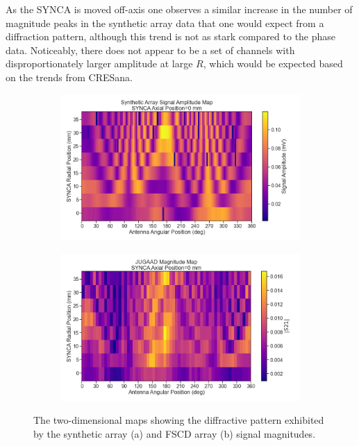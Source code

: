 As the SYNCA is moved off-axis one observes a similar increase in the number of magnitude peaks in the synthetic array data that one would expect from a diffraction pattern, although this trend is not as stark compared to the phase data. Noticeably, there does not appear to be a set of channels with disproportionately larger amplitude at large $R$, which would be expected based on the trends from CRESana. 

\begin{figure}[htbp]
\centering
\begin{subfigure}{.7\textwidth}
  \centering
  \includegraphics[width=1\textwidth]{figs/Chapter-5/230120_synth_array_signal_amplitude_map_z0.png}
  \caption{}
  \label{fig:synth-jugaad-mag-map}
\end{subfigure}
\par\medskip %
\begin{subfigure}{.7\textwidth}
  \centering
  \includegraphics[width=1\textwidth]{figs/Chapter-5/230123_jugaad_magnitude_map_z0.png}
  \caption{}
  \label{fig:jugaad-mag-map}
\end{subfigure}
\caption{The two-dimensional maps showing the diffractive pattern exhibited by the synthetic array (a) and FSCD array (b) signal magnitudes.}
\label{fig:measured-mag-map-comp-jugaad}
\end{figure}

